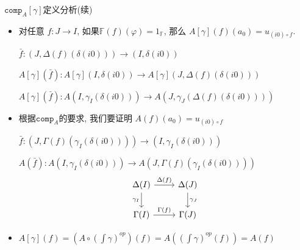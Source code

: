 \documentclass[aspectratio=169,xcolor=dvipsnames]{beamer}
\newcommand\bbF{\mathbb{F}}
\newcommand\comp{\mathtt{comp}}
\begin{document}
\begin{frame}{$\comp_A[\gamma]$定义分析(续)}
\begin{itemize}
  \item 对任意 $f:J\to I$, 如果$\bbF(f)(\varphi)=1_{\bbF}$, 那么 $A[\gamma](f)(a_0) = u_{(i0)\circ f}$.
  
  $\bar{f} : (J,\Delta(f)(\delta(i0))) \to (I,\delta(i0))$

  $A[\gamma](\bar{f}) : A[\gamma](I,\delta(i0)) \to A[\gamma](J,\Delta(f)(\delta(i0)))$

  $A[\gamma](\bar{f}) : A(I,\gamma_I(\delta(i0))) \to A(J,\gamma_J(\Delta(f)(\delta(i0))))$
  \item 根据$\comp_A$的要求, 我们要证明 $A(f)(a_0) = u_{(i0)\circ f}$
  
  $\bar{f} : (J,\Gamma(f)(\gamma_{I}(\delta(i0)))) \to (I,\gamma_I(\delta(i0)))$

  $A(\bar{f}) : A(I,\gamma_I(\delta(i0))) \to A(J,\Gamma(f)(\gamma_{I}(\delta(i0))))$
      \[
    \begin{tikzcd}
      \Delta(I) \arrow[r,"{\Delta(f)}"] \arrow[d,"{\gamma_{I}}"'] & \Delta(J) \arrow[d,"{\gamma_J}"] \\
      \Gamma(I) \arrow[r,"{\Gamma(f)}"] & \Gamma(J)
    \end{tikzcd}
  \]
  \item $A[\gamma](f) = (A\circ(\int\gamma)^{op})(f) = A((\int\gamma)^{op}(f)) = A(f)$
\end{itemize}
\end{frame}
\end{document}
